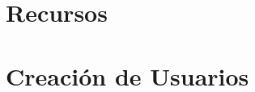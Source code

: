 \documentclass[letterpaper]{article}
\begin{document}


\tableofcontents{}

\section{Recursos}\label{sec:recursos}



\section{Creación de Usuarios}\label{sec:cusuarios}
\end{document}
